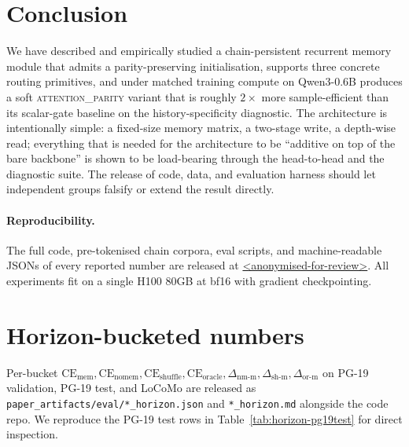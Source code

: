 \documentclass{article}
\newcommand{\dnm}{\Delta_{\text{nm-m}}}
\newcommand{\dsh}{\Delta_{\text{sh-m}}}
\newcommand{\dor}{\Delta_{\text{or-m}}}
\newcommand{\CEmem}{\mathrm{CE}_{\text{mem}}}
\newcommand{\CEnomem}{\mathrm{CE}_{\text{nomem}}}
\newcommand{\CEsh}{\mathrm{CE}_{\text{shuffle}}}
\newcommand{\CEor}{\mathrm{CE}_{\text{oracle}}}
\begin{document}
\section{Conclusion}
We have described and empirically studied a chain-persistent
recurrent memory module that admits a parity-preserving
initialisation, supports three concrete routing primitives, and
under matched training compute on Qwen3-0.6B produces a soft
\textsc{attention\_parity} variant that is roughly $2\times$ more
sample-efficient than its scalar-gate baseline on the
history-specificity diagnostic. The architecture is intentionally
simple: a fixed-size memory matrix, a two-stage write, a
depth-wise read; everything that is needed for the architecture to
be ``additive on top of the bare backbone'' is shown to be load-bearing
through the head-to-head and the diagnostic suite. The release of
code, data, and evaluation harness should let independent groups
falsify or extend the result directly.

\paragraph{Reproducibility.}
The full code, pre-tokenised chain corpora, eval scripts, and
machine-readable JSONs of every reported number are released at
\url{<anonymised-for-review>}. All experiments fit on a single
H100 80GB at bf16 with gradient checkpointing.




\appendix
\section{Horizon-bucketed numbers}
\label{app:horizon}

Per-bucket $\CEmem, \CEnomem, \CEsh, \CEor, \dnm, \dsh, \dor$ on
PG-19 validation, PG-19 test, and LoCoMo are released as
\texttt{paper\_artifacts/eval/*\_horizon.json} and
\texttt{*\_horizon.md} alongside the code repo. We reproduce the
PG-19 test rows in Table~\ref{tab:horizon-pg19test} for direct
inspection.
\end{document}
